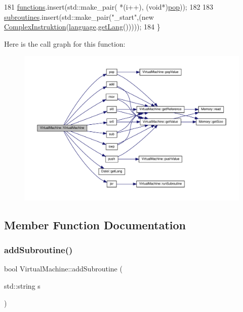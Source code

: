 \begin{DoxyCode}
181     \mbox{\hyperlink{class_virtual_machine_a1b1e03784277347206641bf47e39d6d1}{functions}}.insert(std::make\_pair( *(i++), (\textcolor{keywordtype}{void}*)\mbox{\hyperlink{virtualmachine_8cpp_a7fd81f93e335b7903d4a3ff3a82a6a4f}{pop}}));
182     
183     \mbox{\hyperlink{class_virtual_machine_a91f5b9cfc45eaea5ce95b659705b2803}{subroutines}}.insert(std::make\_pair(\textcolor{stringliteral}{"\_start"},(\textcolor{keyword}{new} 
      \mbox{\hyperlink{class_complex_instruktion}{ComplexInstruktion}}(\mbox{\hyperlink{class_virtual_machine_af4dd2663e7f1ea25ba6c88da94e6ef01}{language}}.\mbox{\hyperlink{class_datei_aeeaf8e269f4d2b53e209ad905b5b75c5}{getLang}}()))));
184 \}
\end{DoxyCode}
Here is the call graph for this function\+:
\nopagebreak
\begin{figure}[H]
\begin{center}
\leavevmode
\includegraphics[width=350pt]{class_virtual_machine_aaaef932333f031a51e9aa16e93931edf_cgraph}
\end{center}
\end{figure}


\subsection{Member Function Documentation}
\mbox{\label{class_virtual_machine_a52907412b34a0b747bfaa26c48253aa9}} 
\subsubsection{\texorpdfstring{add\+Subroutine()}{addSubroutine()}}
{\footnotesize\ttfamily bool Virtual\+Machine\+::add\+Subroutine (\begin{DoxyParamCaption}\item[{std\+::string}]{s }\end{DoxyParamCaption})}

